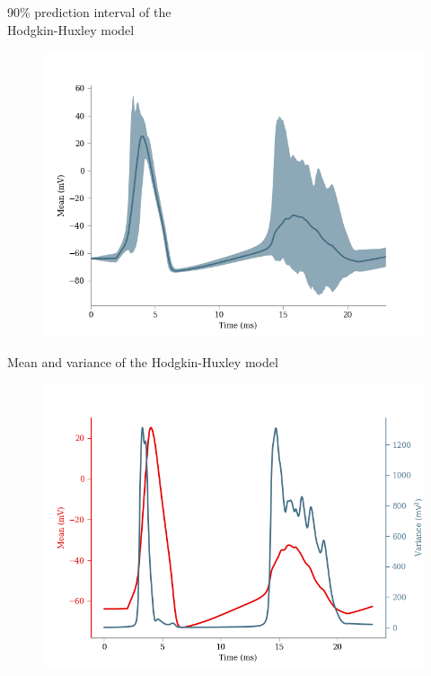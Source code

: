 \documentclass[presentation]{beamer}
\begin{document}

\begin{frame}{90\% prediction interval of the \\ Hodgkin-Huxley model}
  \vspace{-5mm}
  \begin{figure}
    \includegraphics[width=1\textwidth]{hh_prediction.png}
  \end{figure}

\end{frame}




\begin{frame}{Mean and variance of the Hodgkin-Huxley model}
  \vspace{-5mm}
  \begin{figure}
    \includegraphics[width=1\textwidth]{hh_mean.png}
  \end{figure}

\end{frame}
\end{document}
